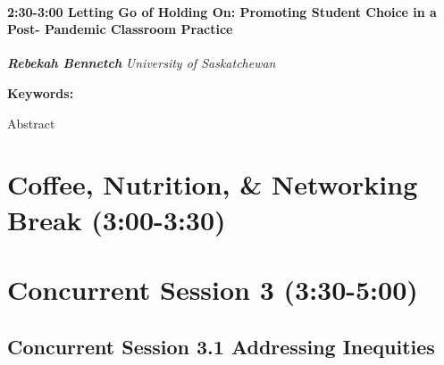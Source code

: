 \documentclass[
]{book}
\begin{document}
\begin{session}
\hypertarget{letting-go-of-holding-on-promoting-student-choice-in-a-post--pandemic-classroom-practice}{%
\paragraph*{\texorpdfstring{2:30-3:00 \textbar{} \textbf{Letting Go of
Holding On: Promoting Student Choice in a Post- Pandemic Classroom}
\textbar{}
Practice}{2:30-3:00 \textbar{} Letting Go of Holding On: Promoting Student Choice in a Post- Pandemic Classroom \textbar{} Practice}}\label{letting-go-of-holding-on-promoting-student-choice-in-a-post--pandemic-classroom-practice}}

\textbf{\emph{Rebekah Bennetch}} \textbar{} \emph{University of
Saskatchewan}

\textbf{Keywords:}

Abstract
\end{session}

\hypertarget{coffee-nutrition-networking-break-300-330}{%
\section*{Coffee, Nutrition, \& Networking Break (3:00-3:30)}\label{coffee-nutrition-networking-break-300-330}}

\hypertarget{concurrent-session-3-330-500}{%
\section*{Concurrent Session 3 (3:30-5:00)}\label{concurrent-session-3-330-500}}

\hypertarget{concurrent-session-3.1-addressing-inequities}{%
\subsection*{Concurrent Session 3.1 \textbar{} Addressing Inequities}\label{concurrent-session-3.1-addressing-inequities}}
\end{document}
